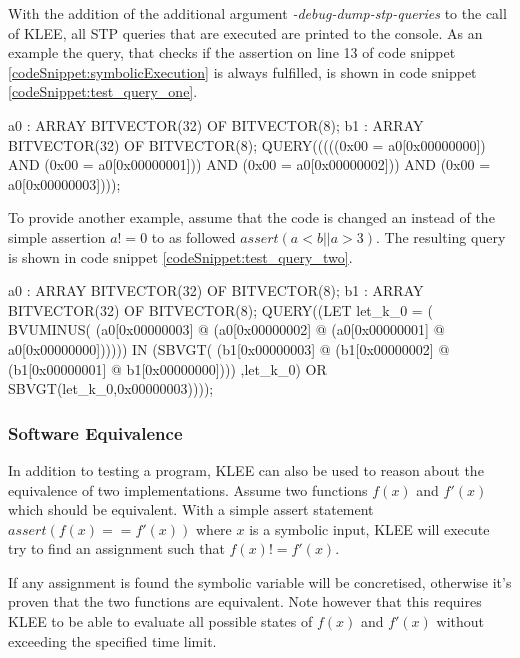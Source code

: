 With the addition of the additional argument \textit{-debug-dump-stp-queries} to the call of KLEE, all STP queries that are executed are printed to the console. As an example the query, that checks if the assertion on line 13 of code snippet \ref{codeSnippet:symbolicExecution} is always fulfilled, is shown in code snippet \ref{codeSnippet:test_query_one}.

\begin{codesnippet}[caption={The query sent to STP when evaluation $assert(a!=0)$ from code snippet \ref{codeSnippet:symbolicExecution}}, label={codeSnippet:test_query_one}]
a0  : ARRAY BITVECTOR(32) OF BITVECTOR(8);
b1  : ARRAY BITVECTOR(32) OF BITVECTOR(8);
QUERY(((((0x00 = a0[0x00000000]) AND
         (0x00 = a0[0x00000001])) AND
         (0x00 = a0[0x00000002])) AND
         (0x00 = a0[0x00000003])));
\end{codesnippet}

To provide another example, assume that the code is changed an instead of the simple assertion $a!=0$ to as followed $assert(a<b || a > 3)$. The resulting query is shown in code snippet \ref{codeSnippet:test_query_two}.

\begin{codesnippet}[caption={The query sent to STP when evaluation $assert(a<b || a > 3)$}, label={codeSnippet:test_query_two}]
a0  : ARRAY BITVECTOR(32) OF BITVECTOR(8);
b1  : ARRAY BITVECTOR(32) OF BITVECTOR(8);
QUERY((LET let_k_0 = ( BVUMINUS( 
  (a0[0x00000003] @ (a0[0x00000002] @
  (a0[0x00000001] @ a0[0x00000000]))))) IN
(SBVGT(
  (b1[0x00000003] @ (b1[0x00000002] @
  (b1[0x00000001] @ b1[0x00000000])))
  ,let_k_0) 
OR SBVGT(let_k_0,0x00000003))));
\end{codesnippet}


\subsubsection{Software Equivalence}\label{section:software_equivalence}
In addition to testing a program, KLEE can also be used to reason about the equivalence of two implementations. Assume two functions $f(x)$ and $f'(x)$ which should be equivalent. With a simple assert statement $assert(f(x) == f'(x))$ where $x$ is a symbolic input, KLEE will execute try to find an assignment such that $f(x) != f'(x)$.

If any assignment is found the symbolic variable will be concretised, otherwise it's proven that the two functions are equivalent. Note however that this requires KLEE to be able to evaluate all possible states of $f(x)$ and $f'(x)$ without exceeding the specified time limit.
